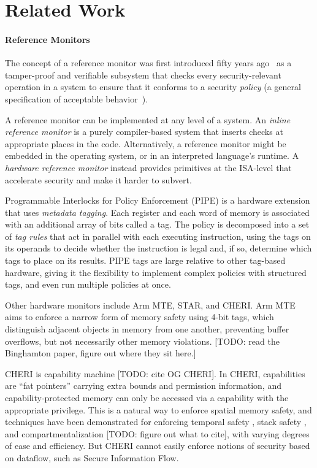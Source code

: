 \documentclass{llncs}
\begin{document}
{\section{Related Work}

\paragraph{Reference Monitors}

The concept of a reference monitor was first introduced fifty years ago~\cite{Anderson72:PlanningStudy}
as a tamper-proof and verifiable subsystem that checks every security-relevant operation in a system to
ensure that it conforms to a security {\em policy} (a general specification of acceptable behavior~\cite{Goguen82:SecurityPolicies}).

A reference monitor can be implemented at any level of a system. An {\em inline reference monitor}\cite{??}
is a purely compiler-based system that inserts checks at appropriate places in the code.
Alternatively, a reference monitor might be embedded in the operating system, or in an interpreted
language's runtime. A {\em hardware reference monitor} instead provides primitives at the ISA-level
that accelerate security and make it harder to subvert.

Programmable Interlocks for Policy Enforcement (PIPE) \cite{Dhawan14:PUMP} is a hardware extension
that uses {\em metadata tagging}. Each register and each word of memory is associated with
an additional array of bits called a tag. The policy is decomposed into a set of {\em tag rules}
that act in parallel with each executing instruction, using the tags on its operands to
decide whether the instruction is legal and, if so, determine which tags to place on its results.
PIPE tags are large relative to other tag-based hardware, giving it the flexibility
to implement complex policies with structured tags, and even run multiple policies at once.

Other hardware monitors include Arm MTE, STAR, and CHERI.
Arm MTE aims to enforce a narrow form of memory safety using 4-bit tags, which distinguish adjacent objects
in memory from one another, preventing buffer overflows, but not necessarily other memory violations.
[TODO: read the Binghamton paper, figure out where they sit here.] 

CHERI is capability machine [TODO: cite OG CHERI]. In CHERI, capabilities
are ``fat pointers'' carrying extra bounds and permission information, and capability-protected
memory can only be accessed via a capability with the appropriate privilege. This is a natural
way to enforce spatial memory safety, and techniques have been demonstrated for enforcing
temporal safety \cite{NWF20:Cornucopia}, stack safety \cite{Skorstengaard19:stktokens},
and compartmentalization [TODO: figure out what to cite], with varying degrees of ease and
efficiency. But CHERI cannot easily enforce notions of security based on dataflow,
such as Secure Information Flow.

}
\end{document}
